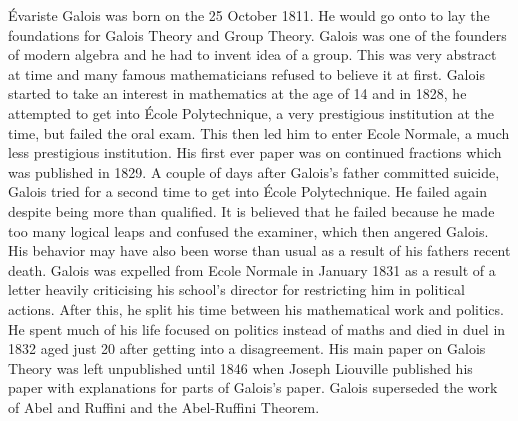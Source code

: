 \'Evariste Galois was born on the 25 October 1811. He would go onto to lay the foundations for Galois Theory and Group Theory. Galois was one of the founders of modern algebra and he had to invent idea of a group. This was very abstract at time and many famous mathematicians refused to believe it at first. Galois started to take an interest in mathematics at the age of 14 and in 1828, he attempted to get into \'Ecole Polytechnique, a very prestigious institution at the time, but failed the oral exam. This then led him to enter Ecole Normale, a much less prestigious institution. His first ever paper was on continued fractions which was published in 1829. A couple of days after Galois's father committed suicide, Galois tried for a second time to get into \'Ecole Polytechnique. He failed again despite being more than qualified. It is believed that he failed because he made too many logical leaps and confused the examiner, which then angered Galois. His behavior may have also been worse than usual as a result of his fathers recent death. Galois was expelled from Ecole Normale in January 1831 as a result of a letter heavily criticising his school's director for restricting him in political actions. After this, he split his time between his mathematical work and politics. He spent much of his life focused on politics instead of maths and died in duel in 1832 aged just 20 after getting into a disagreement. His main paper on Galois Theory was left unpublished until 1846 when Joseph Liouville published his paper with explanations for parts of Galois's paper. Galois superseded the work of Abel and Ruffini and the Abel-Ruffini Theorem.